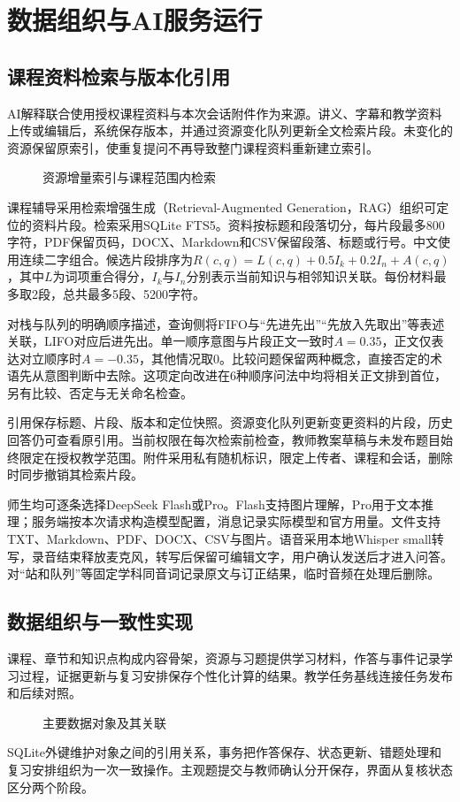 \documentclass[UTF8,zihao=-4,fontset=none,a4paper]{ctexart}
\newcommand{\diagram}[2]{\par\begin{figure}[htbp]\centering\caption{#2}\end{figure}\par}
\begin{document}
\section{数据组织与AI服务运行}

\subsection{课程资料检索与版本化引用}

AI解释联合使用授权课程资料与本次会话附件作为来源。讲义、字幕和教学资料上传或编辑后，系统保存版本，并通过资源变化队列更新全文检索片段。未变化的资源保留原索引，使重复提问不再导致整门课程资料重新建立索引。
\diagram{retrieval}{资源增量索引与课程范围内检索}
课程辅导采用检索增强生成（Retrieval-Augmented Generation，RAG）组织可定位的资料片段。检索采用SQLite FTS5\cite{sqlite,rag}。资料按标题和段落切分，每片段最多800字符，PDF保留页码，DOCX、Markdown和CSV保留段落、标题或行号。中文使用连续二字组合。候选片段排序为$R(c,q)=L(c,q)+0.5I_k+0.2I_n+A(c,q)$，其中$L$为词项重合得分，$I_k$与$I_n$分别表示当前知识与相邻知识关联。每份材料最多取2段，总共最多5段、5200字符。

对栈与队列的明确顺序描述，查询侧将FIFO与“先进先出”“先放入先取出”等表述关联，LIFO对应后进先出。单一顺序意图与片段正文一致时$A=0.35$，正文仅表达对立顺序时$A=-0.35$，其他情况取0。比较问题保留两种概念，直接否定的术语先从意图判断中去除。这项定向改进在6种顺序问法中均将相关正文排到首位，另有比较、否定与无关命名检查。

引用保存标题、片段、版本和定位快照。资源变化队列更新变更资料的片段，历史回答仍可查看原引用。当前权限在每次检索前检查，教师教案草稿与未发布题目始终限定在授权教学范围。附件采用私有随机标识，限定上传者、课程和会话，删除时同步撤销其检索片段。

师生均可逐条选择DeepSeek Flash或Pro。Flash支持图片理解，Pro用于文本推理；服务端按本次请求构造模型配置，消息记录实际模型和官方用量。文件支持TXT、Markdown、PDF、DOCX、CSV与图片。语音采用本地Whisper small转写\cite{whisper}，录音结束释放麦克风，转写后保留可编辑文字，用户确认发送后才进入问答。对“站和队列”等固定学科同音词记录原文与订正结果，临时音频在处理后删除。

\subsection{数据组织与一致性实现}

课程、章节和知识点构成内容骨架，资源与习题提供学习材料，作答与事件记录学习过程，证据更新与复习安排保存个性化计算的结果。教学任务基线连接任务发布和后续对照。
\diagram{data}{主要数据对象及其关联}
SQLite外键维护对象之间的引用关系，事务把作答保存、状态更新、错题处理和复习安排组织为一次一致操作。主观题提交与教师确认分开保存，界面从复核状态区分两个阶段。
\end{document}
